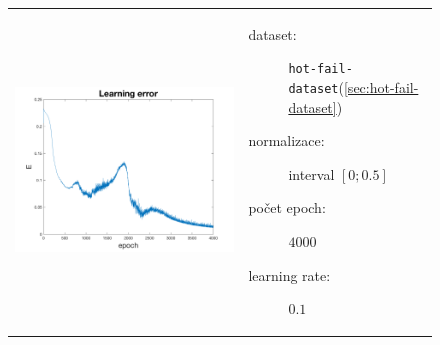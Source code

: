\documentclass[thesis=M,czech]{FITthesis}[2012/06/26]
\begin{document}
\begin{figure}[htbp]
\begin{tabular}{p{}p{}}
    \begin{minipage}{.5\textwidth}
    \centering
    \includegraphics[scale=0.3]{err_hot-fail.png}
    \label{fig:fig1}
    \end{minipage}
    &
    \begin{minipage}{.5\textwidth}
		\begin{description}
            \item[dataset:] \texttt{hot-fail-dataset}(\ref{sec:hot-fail-dataset})
            \item[normalizace:] interval $[0;0.5]$
            \item[počet epoch:] $4000$
            \item[learning rate:] $0.1$
        \end{description}
\end{minipage}
\end{tabular}
\end{figure}
\end{document}
